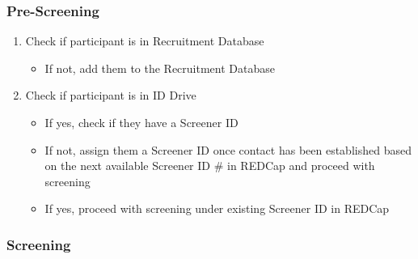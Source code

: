 \documentclass[]{book}
\providecommand{\tightlist}{%
  \setlength{\itemsep}{0pt}\setlength{\parskip}{0pt}}
\begin{document}
\hypertarget{pre-screening-1}{%
\subsubsection{Pre-Screening}\label{pre-screening-1}}

\begin{enumerate}
\def\labelenumi{\arabic{enumi}.}
\tightlist
\item
  Check if participant is in Recruitment Database

  \begin{itemize}
  \tightlist
  \item
    If not, add them to the Recruitment Database
  \end{itemize}
\item
  Check if participant is in ID Drive

  \begin{itemize}
  \tightlist
  \item
    If yes, check if they have a Screener ID
  \item
    If not, assign them a Screener ID once contact has been established based on the next available Screener ID \# in REDCap and proceed with screening
  \item
    If yes, proceed with screening under existing Screener ID in REDCap
  \end{itemize}
\end{enumerate}

\hypertarget{screening-1}{%
\subsubsection{Screening}\label{screening-1}}
\end{document}
